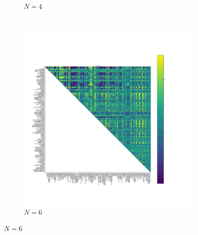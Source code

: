 \documentclass{article}
\begin{document}
\begin{figure}[!hbtp]
\begin{subfigure}[t]{.3\textwidth}
        \caption{\(N=4\)}
    \end{subfigure}%
    ~
    \begin{subfigure}[t]{.3\textwidth}
        \centering
        \includegraphics[width=.8\textwidth]{../img/fixation_heatmap_6_std.pdf}
        \caption{\(N=6\)}
    \end{subfigure}%


\end{figure}
\end{document}
